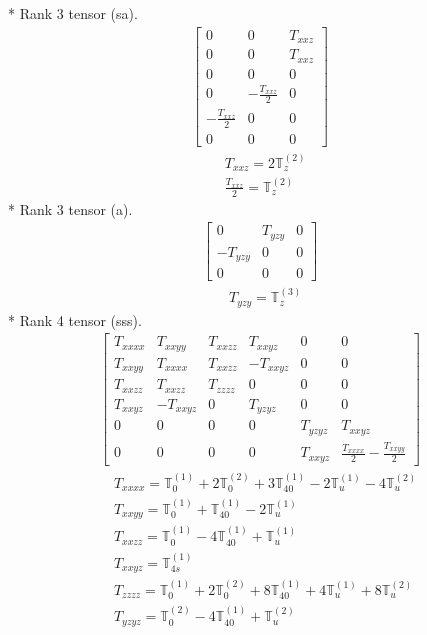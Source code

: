 \documentclass[fleqn,8pt,landscape]{jsarticle}
\begin{document}
* Rank 3 tensor (sa).
\begin{align*}
\begin{bmatrix} 0 & 0 & T_{xxz} \\ 0 & 0 & T_{xxz} \\ 0 & 0 & 0 \\ 0 & - \frac{T_{xxz}}{2} & 0 \\ - \frac{T_{xxz}}{2} & 0 & 0 \\ 0 & 0 & 0 \end{bmatrix}
\end{align*}
\begin{align*}
& T_{xxz} = 2 \mathbb{T}_{z}^{(2)} \\
& \frac{T_{xxz}}{2} = \mathbb{T}_{z}^{(2)}
\end{align*}
* Rank 3 tensor (a).
\begin{align*}
\begin{bmatrix} 0 & T_{yzy} & 0 \\ - T_{yzy} & 0 & 0 \\ 0 & 0 & 0 \end{bmatrix}
\end{align*}
\begin{align*}
& T_{yzy} = \mathbb{T}_{z}^{(3)}
\end{align*}
* Rank 4 tensor (sss).
\begin{align*}
\begin{bmatrix} T_{xxxx} & T_{xxyy} & T_{xxzz} & T_{xxyz} & 0 & 0 \\ T_{xxyy} & T_{xxxx} & T_{xxzz} & - T_{xxyz} & 0 & 0 \\ T_{xxzz} & T_{xxzz} & T_{zzzz} & 0 & 0 & 0 \\ T_{xxyz} & - T_{xxyz} & 0 & T_{yzyz} & 0 & 0 \\ 0 & 0 & 0 & 0 & T_{yzyz} & T_{xxyz} \\ 0 & 0 & 0 & 0 & T_{xxyz} & \frac{T_{xxxx}}{2} - \frac{T_{xxyy}}{2} \end{bmatrix}
\end{align*}
\begin{align*}
& T_{xxxx} = \mathbb{T}_{0}^{(1)} + 2 \mathbb{T}_{0}^{(2)} + 3 \mathbb{T}_{40}^{(1)} - 2 \mathbb{T}_{u}^{(1)} - 4 \mathbb{T}_{u}^{(2)} \\
& T_{xxyy} = \mathbb{T}_{0}^{(1)} + \mathbb{T}_{40}^{(1)} - 2 \mathbb{T}_{u}^{(1)} \\
& T_{xxzz} = \mathbb{T}_{0}^{(1)} - 4 \mathbb{T}_{40}^{(1)} + \mathbb{T}_{u}^{(1)} \\
& T_{xxyz} = \mathbb{T}_{4s}^{(1)} \\
& T_{zzzz} = \mathbb{T}_{0}^{(1)} + 2 \mathbb{T}_{0}^{(2)} + 8 \mathbb{T}_{40}^{(1)} + 4 \mathbb{T}_{u}^{(1)} + 8 \mathbb{T}_{u}^{(2)} \\
& T_{yzyz} = \mathbb{T}_{0}^{(2)} - 4 \mathbb{T}_{40}^{(1)} + \mathbb{T}_{u}^{(2)}
\end{align*}
\end{document}
